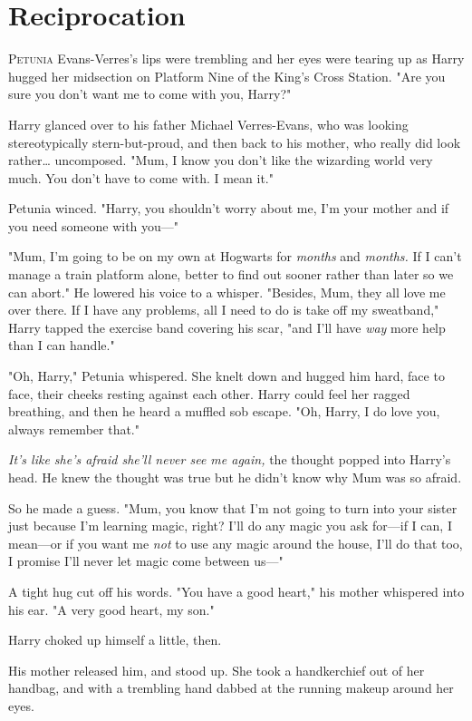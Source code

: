 \chapter{Reciprocation}

\lettrine{P}{etunia} Evans-Verres's lips were trembling and her eyes were tearing up as 
Harry hugged her midsection on Platform Nine of the King's Cross Station. "Are 
you sure you don't want me to come with you, Harry?"

Harry glanced over to his father Michael Verres-Evans, who was looking 
stereotypically stern-but-proud, and then back to his mother, who really did 
look rather{\ldots} uncomposed. "Mum, I know you don't like the wizarding world 
very much. You don't have to come with. I mean it."

Petunia winced. "Harry, you shouldn't worry about me, I'm your mother and if 
you need someone with you---"

"Mum, I'm going to be on my own at Hogwarts for \emph{months} and 
\emph{months.} If I can't manage a train platform alone, better to find out 
sooner rather than later so we can abort." He lowered his voice to a whisper. 
"Besides, Mum, they all love me over there. If I have any problems, all I need 
to do is take off my sweatband," Harry tapped the exercise band covering his 
scar, "and I'll have \emph{way} more help than I can handle."

"Oh, Harry," Petunia whispered. She knelt down and hugged him hard, face to 
face, their cheeks resting against each other. Harry could feel her ragged 
breathing, and then he heard a muffled sob escape. "Oh, Harry, I do love you, 
always remember that."

\emph{It's like she's afraid she'll never see me again,} the thought popped 
into Harry's head. He knew the thought was true but he didn't know why Mum was 
so afraid.

So he made a guess. "Mum, you know that I'm not going to turn into your sister 
just because I'm learning magic, right? I'll do any magic you ask for---if I 
can, I mean---or if you want me \emph{not} to use any magic around the house, 
I'll do that too, I promise I'll never let magic come between us---"

A tight hug cut off his words. "You have a good heart," his mother whispered 
into his ear. "A very good heart, my son."

Harry choked up himself a little, then.

His mother released him, and stood up. She took a handkerchief out of her 
handbag, and with a trembling hand dabbed at the running makeup around her eyes.

